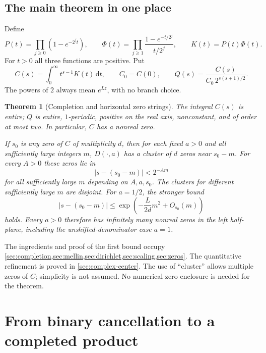 \documentclass[11pt,a4paper]{article}
\numberwithin{equation}{section}
\newtheorem{theorem}{Theorem}[section]
\theoremstyle{definition}
\theoremstyle{remark}
\newcommand{\dd}{\,\mathrm d}
\newcommand{\abs}[1]{\left|#1\right|}
\begin{document}
\subsection{The main theorem in one place}
Define
\begin{equation}
 P(t)=\prod_{j\ge0}(1-e^{-2^jt}),\qquad
 \Phi(t)=\prod_{j\ge1}\frac{1-e^{-t/2^j}}{t/2^j},
 \qquad K(t)=P(t)\Phi(t).
 \label{eq:three-products}
\end{equation}
For $t>0$ all three functions are positive. Put
\begin{equation}
 C(s)=\int_0^\infty t^{s-1}K(t)\dd t,
 \qquad C_0=C(0),\qquad
 Q(s)=\frac{C(s)}{C_0\,2^{s(s+1)/2}}.
 \label{eq:CQ-def}
\end{equation}
The powers of $2$ always mean $e^{Lz}$, with no branch choice.

\begin{theorem}[Completion and horizontal zero strings]
\label{thm:overview}
The integral $C(s)$ is entire; $Q$ is entire, $1$-periodic,
positive on the real axis, nonconstant, and of order at most two.
In particular, $C$ has a nonreal zero.

If $s_0$ is any zero of $C$ of multiplicity $d$, then for each fixed
$a>0$ and all sufficiently large integers $m$, $D(\cdot,a)$ has a
cluster of $d$ zeros near $s_0-m$. For every $A>0$ these zeros lie in
\begin{equation}
 \abs{s-(s_0-m)}<2^{-Am}
 \label{eq:zero-supergeometric}
\end{equation}
for all sufficiently large $m$ depending on $A,a,s_0$.
The clusters for different sufficiently large $m$ are disjoint.
For $a=1/2$, the stronger bound
\begin{equation}
 \abs{s-(s_0-m)}\le
 \exp\left(-\frac{L}{2d}m^2+O_{s_0}(m)\right)
 \label{eq:zero-gaussian}
\end{equation}
holds. Every $a>0$ therefore has infinitely many nonreal zeros in the
left half-plane, including the unshifted-denominator case $a=1$.
\end{theorem}

The ingredients and proof of the first bound occupy
\cref{sec:completion,sec:mellin,sec:dirichlet,sec:scaling,sec:zeros}.
The quantitative refinement is proved in \cref{sec:complex-center}.
The use of ``cluster'' allows multiple zeros of $C$; simplicity is not
assumed. No numerical zero enclosure is needed for the theorem.

\section{From binary cancellation to a completed product}
\label{sec:completion}
\end{document}
